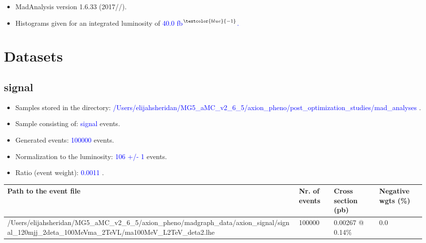 \documentclass[a4paper, 10pt]{article}
\begin{document}
\begin{itemize}
  \item MadAnalysis version 1.6.33 (2017//).
   \item Histograms given for an integrated luminosity of \textcolor{blue}{40.0}\textcolor{blue}{ fb}$^{\textcolor{blue}{-1}}$\textcolor{blue}{.}
\textcolor{blue}{}
\end{itemize}
\newpage
\section{ Datasets}

\subsection{ signal}

\begin{itemize}
  \item Samples stored in the directory: \textcolor{blue}{/\-Users/\-elijahsheridan/\-MG5\_aMC\_v2\_6\_5/\-axion\_pheno/\-post\_optimization\_studies/\-mad\_analyses} .
   \item Sample consisting of: \textcolor{blue}{signal}  events.
   \item Generated events: \textcolor{blue}{100000 }  events.
   \item Normalization to the luminosity: \textcolor{blue}{106}\textcolor{blue}{ +/\-- }\textcolor{blue}{1 }  events.
   \item Ratio (event weight): \textcolor{blue}{0.0011 } .  
 
\end{itemize}
\begin{table}[H]
  \begin{center}
    \begin{tabular}{|m{55.0mm}|m{25.0mm}|m{30.0mm}|m{30.0mm}|}
      \hline
      {\cellcolor{yellow}         Path to the event file}& {\cellcolor{yellow}         Nr. of events}& {\cellcolor{yellow}         Cross section (pb)}& {\cellcolor{yellow}         Negative wgts (\%)}\\
      \hline
      {\cellcolor{white}          /\-Users/\-elijahsheridan/\-MG5\_aMC\_v2\_6\_5/\-axion\_pheno/\-madgraph\_data/\-axion\_signal/\-signal\_120mjj\_2deta\_100MeVma\_2TeVL/\-ma100MeV\_L2TeV\_deta2.lhe}& {\cellcolor{white}          100000}& {\cellcolor{white}          0.00267 @ 0.14\%}& {\cellcolor{white}          0.0}\\
\hline
    \end{tabular}
  \end{center}
\end{table}
\end{document}
